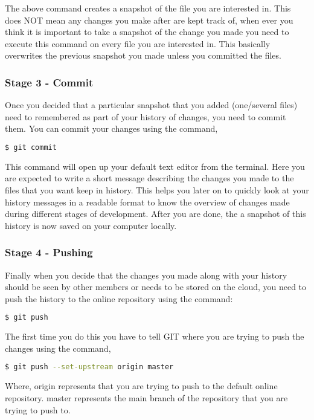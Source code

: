 \documentclass{cmc}
\begin{document}
The above command creates a snapshot of the file you are interested
in. This does NOT mean any changes you make after are kept track of,
when ever you think it is important to take a snapshot of the change
you made you need to execute this command on every file you are
interested in. This basically overwrites the previous snapshot you
made unless you committed the files.

\subsubsection{Stage 3 - Commit}
\label{sec:stage-3-commit}

Once you decided that a particular snapshot that you added
(one/several files) need to remembered as part of your history of
changes, you need to commit them.  You can commit your changes using
the command,

\begin{lstlisting}[language=bash]
$ git commit
\end{lstlisting}

This command will open up your default text editor from the
terminal. Here you are expected to write a short message describing
the changes you made to the files that you want keep in history. This
helps you later on to quickly look at your history messages in a
readable format to know the overview of changes made during different
stages of development. After you are done, the a snapshot of this
history is now saved on your computer locally.

\subsubsection{Stage 4 - Pushing}
\label{sec:stage-4-pushing}

Finally when you decide that the changes you made along with your history
should be seen by other members or needs to be stored on the cloud, you need
to push the history to the online repository using the command:

\begin{lstlisting}[language=bash]
$ git push
\end{lstlisting}

The first time you do this you have to tell GIT where you are trying to push the
changes using the command,

\begin{lstlisting}[language=bash]
$ git push --set-upstream origin master
\end{lstlisting}

Where,
origin represents that you are trying to push to the default online repository.
master represents the main branch of the repository that you are trying to push to.
\end{document}
